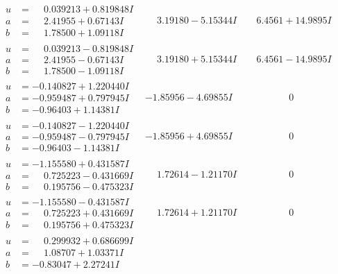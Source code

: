 \documentclass[1p]{elsarticle_modified}
\theoremstyle{definition}
\begin{document}
$$\begin{array}{c|c|c}
\begin{aligned}
u &= \phantom{-}0.039213 + 0.819848 I \\
a &= \phantom{-}2.41955 + 0.67143 I \\
b &= \phantom{-}1.78500 + 1.09118 I\end{aligned}
 & \phantom{-}3.19180 - 5.15344 I & \phantom{-}6.4561 + 14.9895 I \\ \hline\begin{aligned}
u &= \phantom{-}0.039213 - 0.819848 I \\
a &= \phantom{-}2.41955 - 0.67143 I \\
b &= \phantom{-}1.78500 - 1.09118 I\end{aligned}
 & \phantom{-}3.19180 + 5.15344 I & \phantom{-}6.4561 - 14.9895 I \\ \hline\begin{aligned}
u &= -0.140827 + 1.220440 I \\
a &= -0.959487 + 0.797945 I \\
b &= -0.96403 + 1.14381 I\end{aligned}
 & -1.85956 - 4.69855 I & \phantom{-0.000000 } 0 \\ \hline\begin{aligned}
u &= -0.140827 - 1.220440 I \\
a &= -0.959487 - 0.797945 I \\
b &= -0.96403 - 1.14381 I\end{aligned}
 & -1.85956 + 4.69855 I & \phantom{-0.000000 } 0 \\ \hline\begin{aligned}
u &= -1.155580 + 0.431587 I \\
a &= \phantom{-}0.725223 - 0.431669 I \\
b &= \phantom{-}0.195756 - 0.475323 I\end{aligned}
 & \phantom{-}1.72614 - 1.21170 I & \phantom{-0.000000 } 0 \\ \hline\begin{aligned}
u &= -1.155580 - 0.431587 I \\
a &= \phantom{-}0.725223 + 0.431669 I \\
b &= \phantom{-}0.195756 + 0.475323 I\end{aligned}
 & \phantom{-}1.72614 + 1.21170 I & \phantom{-0.000000 } 0 \\ \hline\begin{aligned}
u &= \phantom{-}0.299932 + 0.686699 I \\
a &= \phantom{-}1.08707 + 1.03371 I \\
b &= -0.83047 + 2.27241 I\end{aligned}

\end{array}$$
\end{document}
